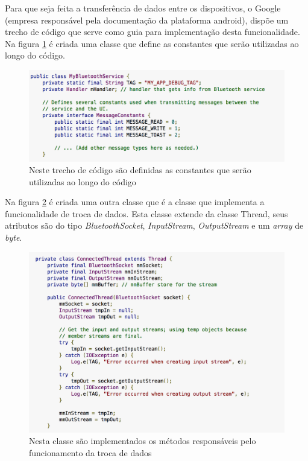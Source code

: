   	Para que seja feita a transferência de dados entre os dispositivos, o Google (empresa responsável pela documentação da plataforma android), dispõe um trecho de código que serve como guia para implementação desta funcionalidade. Na figura \ref{img:trecho1} é criada uma classe que define as constantes que serão utilizadas ao longo do código.
  	
  	\graphicspath{{figuras/}}
  	\begin{figure}[h!]
  	\centering
  	\includegraphics[scale=0.60]{classe_MyBluetoothService}
  	\caption{Neste trecho de código são definidas as constantes que serão utilizadas ao longo do código}
  	\label{img:trecho1}
  	\end{figure}
  
Na figura \ref{img:trecho2} é criada uma outra classe que é a classe que implementa a funcionalidade de troca de dados. Esta classe extende da classe Thread, seus atributos são do tipo \textit{BluetoothSocket}, \textit{InputStream}, \textit{OutputStream} e um \textit{array} de \textit{byte}.

\graphicspath{{figuras/}}
\begin{figure}[h!]
\centering
\includegraphics[scale=0.80]{classe_ConnectedThread}
\caption{Nesta classe são implementados os métodos responsáveis pelo funcionamento da troca de dados}
\label{img:trecho2}
\end{figure}

